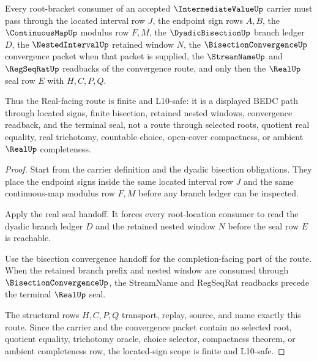 \begin{theorem}
\label{thm:intermediatevalue-located-sign-scope}
Every root-bracket consumer of an accepted $\IntermediateValueUp$ carrier must pass through the located interval row $J$, the endpoint sign rows $A,B$, the $\ContinuousMapUp$ modulus row $F,M$, the $\DyadicBisectionUp$ branch ledger $D$, the $\NestedIntervalUp$ retained window $N$, the $\BisectionConvergenceUp$ convergence packet when that packet is supplied, the $\StreamNameUp$ and $\RegSeqRatUp$ readbacks of the convergence route, and only then the $\RealUp$ seal row $E$ with $H,C,P,Q$.

Thus the Real-facing route is finite and L10-safe: it is a displayed BEDC path through located signs, finite bisection, retained nested windows, convergence readback, and the terminal seal, not a route through selected roots, quotient real equality, real trichotomy, countable choice, open-cover compactness, or ambient $\RealUp$ completeness.
\end{theorem}
\begin{proof}
Start from the carrier definition and the dyadic bisection obligations. They place the endpoint signs inside the same located interval row $J$ and the same continuous-map modulus row $F,M$ before any branch ledger can be inspected.

Apply the real seal handoff. It forces every root-location consumer to read the dyadic branch ledger $D$ and the retained nested window $N$ before the seal row $E$ is reachable.

Use the bisection convergence handoff for the completion-facing part of the route. When the retained branch prefix and nested window are consumed through $\BisectionConvergenceUp$, the StreamName and RegSeqRat readbacks precede the terminal $\RealUp$ seal.

The structural rows $H,C,P,Q$ transport, replay, source, and name exactly this route. Since the carrier and the convergence packet contain no selected root, quotient equality, trichotomy oracle, choice selector, compactness theorem, or ambient completeness row, the located-sign scope is finite and L10-safe.
\end{proof}

